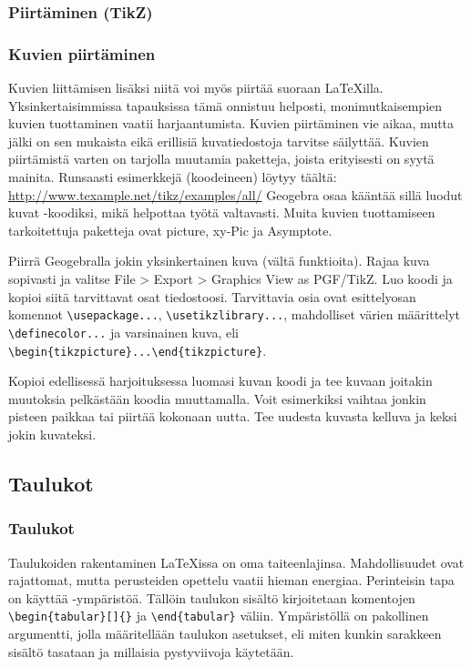 \subsubsection{Piirtäminen (TikZ)}
\begin{fframe}
    \frametitle{Kuvien piirtäminen}
    Kuvien liittämisen lisäksi niitä voi myös piirtää suoraan \LaTeX illa. Yksinkertaisimmissa tapauksissa tämä onnistuu helposti, monimutkaisempien kuvien tuottaminen vaatii harjaantumista.
    \vaihto
    Kuvien piirtäminen vie aikaa, mutta jälki on sen mukaista eikä erillisiä kuvatiedostoja tarvitse säilyttää.
    \pause
    \vaihto Kuvien piirtämistä varten on tarjolla muutamia paketteja, joista erityisesti \TikZ{} on syytä mainita. Runsaasti esimerkkejä (koodeineen) löytyy täältä: \url{http://www.texample.net/tikz/examples/all/}
    \pause
    \vaihto Geogebra osaa kääntää sillä luodut kuvat \TikZ-koodiksi, mikä helpottaa työtä valtavasti.
    \pause
    \vaihto Muita kuvien tuottamiseen tarkoitettuja paketteja ovat picture, xy-Pic ja Asymptote.
\end{fframe}

\begin{fframe}
    \begin{harj}
    Piirrä Geogebralla jokin yksinkertainen kuva (vältä funktioita). Rajaa kuva sopivasti ja valitse File > Export > Graphics View as PGF/TikZ. Luo koodi ja kopioi siitä tarvittavat osat tiedostoosi. Tarvittavia osia ovat esittelyosan komennot \lstinline-\usepackage...-, \lstinline-\usetikzlibrary...-, mahdolliset värien määrittelyt \lstinline-\definecolor...- ja varsinainen kuva, eli \lstinline-\begin{tikzpicture}...\end{tikzpicture}-. 
    \end{harj}
    \begin{harj}
        \label{kelluvaTikz}
        Kopioi edellisessä harjoituksessa luomasi kuvan koodi ja tee kuvaan joitakin muutoksia pelkästään koodia muuttamalla. Voit esimerkiksi vaihtaa jonkin pisteen paikkaa tai piirtää kokonaan uutta. Tee uudesta kuvasta kelluva ja keksi jokin kuvateksi. 
    \end{harj}
\end{fframe}


\subsection{Taulukot}
\begin{fframe}
    \frametitle{Taulukot}
    Taulukoiden rakentaminen \LaTeX issa on oma taiteenlajinsa. Mahdollisuudet ovat rajattomat, mutta perusteiden opettelu vaatii hieman energiaa. 
    \pause
    \vaihto
Perinteisin tapa on käyttää -ympäristöä. Tällöin taulukon sisältö kirjoitetaan komentojen \lstinline-\begin{tabular}[]{}- ja \lstinline-\end{tabular}- väliin.
    \pause
    \vaihto
    Ympäristöllä on pakollinen argumentti, jolla määritellään taulukon asetukset, eli miten kunkin sarakkeen sisältö tasataan ja millaisia pystyviivoja käytetään.
\end{fframe}

